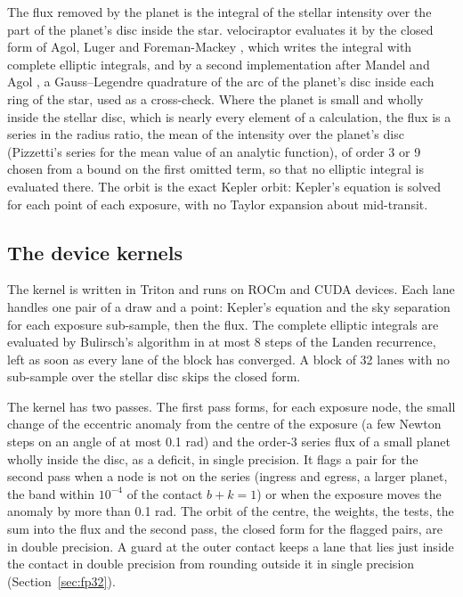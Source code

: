 \documentclass[11pt]{article}
\begin{document}
The flux removed by the planet is the integral of the stellar intensity over the part of the planet's disc inside the star. velociraptor evaluates it by the closed form of Agol, Luger and Foreman-Mackey \cite{agol2020}, which writes the integral with complete elliptic integrals, and by a second implementation after Mandel and Agol \cite{mandel2002}, a Gauss--Legendre quadrature of the arc of the planet's disc inside each ring of the star, used as a cross-check. Where the planet is small and wholly inside the stellar disc, which is nearly every element of a calculation, the flux is a series in the radius ratio, the mean of the intensity over the planet's disc (Pizzetti's series for the mean value of an analytic function), of order 3 or 9 chosen from a bound on the first omitted term, so that no elliptic integral is evaluated there. The orbit is the exact Kepler orbit: Kepler's equation is solved for each point of each exposure, with no Taylor expansion about mid-transit.

\subsection{The device kernels}

The kernel is written in Triton and runs on ROCm and CUDA devices. Each lane handles one pair of a draw and a point: Kepler's equation and the sky separation for each exposure sub-sample, then the flux. The complete elliptic integrals are evaluated by Bulirsch's algorithm in at most 8 steps of the Landen recurrence, left as soon as every lane of the block has converged. A block of 32 lanes with no sub-sample over the stellar disc skips the closed form.

The kernel has two passes. The first pass forms, for each exposure node, the small change of the eccentric anomaly from the centre of the exposure (a few Newton steps on an angle of at most 0.1 rad) and the order-3 series flux of a small planet wholly inside the disc, as a deficit, in single precision. It flags a pair for the second pass when a node is not on the series (ingress and egress, a larger planet, the band within $10^{-4}$ of the contact $b+k=1$) or when the exposure moves the anomaly by more than 0.1 rad. The orbit of the centre, the weights, the tests, the sum into the flux and the second pass, the closed form for the flagged pairs, are in double precision. A guard at the outer contact keeps a lane that lies just inside the contact in double precision from rounding outside it in single precision (Section~\ref{sec:fp32}).
\end{document}
